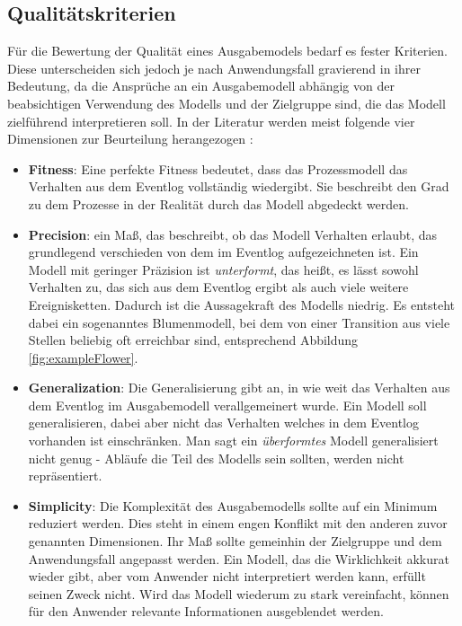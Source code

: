 \subsection{Qualitätskriterien}\label{sec:quality}
Für die Bewertung der Qualität eines Ausgabemodels  bedarf es fester Kriterien. Diese unterscheiden sich jedoch je nach Anwendungsfall gravierend in ihrer Bedeutung, da die Ansprüche an ein Ausgabemodell abhängig von der beabsichtigen Verwendung des Modells und der Zielgruppe sind, die das Modell zielführend interpretieren soll. In der Literatur werden meist folgende vier Dimensionen zur Beurteilung herangezogen \cite{PMinAction}:

\begin{itemize}
\item \textbf{Fitness}: Eine perfekte Fitness bedeutet, dass das Prozessmodell das Verhalten aus dem Eventlog vollständig wiedergibt. Sie beschreibt den Grad zu dem Prozesse in der Realität durch das Modell abgedeckt werden.
 
\item \textbf{Precision}: ein Maß, das beschreibt, ob das Modell Verhalten erlaubt, das grundlegend verschieden von dem im Eventlog aufgezeichneten ist. Ein Modell mit geringer Präzision ist \textit{unterformt}, das heißt, es lässt sowohl Verhalten zu, das sich aus dem Eventlog ergibt als auch viele weitere Ereignisketten. Dadurch ist die Aussagekraft des Modells niedrig. Es entsteht dabei ein sogenanntes Blumenmodell, bei dem von einer Transition aus viele Stellen beliebig oft erreichbar sind, entsprechend Abbildung \ref{fig:exampleFlower}.

\item \textbf{Generalization}: Die Generalisierung gibt an, in wie weit das Verhalten aus dem Eventlog im Ausgabemodell verallgemeinert wurde. Ein Modell soll generalisieren, dabei aber nicht das Verhalten welches in dem Eventlog vorhanden ist einschränken. Man sagt ein \textit{überformtes} Modell generalisiert nicht genug - Abläufe die Teil des Modells sein sollten, werden nicht repräsentiert.

\item \textbf{Simplicity}: Die Komplexität des Ausgabemodells sollte auf ein Minimum reduziert werden. Dies steht in einem engen Konflikt mit den anderen zuvor genannten Dimensionen. Ihr Maß sollte gemeinhin der Zielgruppe und dem Anwendungsfall angepasst werden. Ein Modell, das die Wirklichkeit akkurat wieder gibt, aber vom Anwender nicht interpretiert werden kann, erfüllt seinen Zweck nicht. Wird das Modell wiederum zu stark vereinfacht, können für den Anwender relevante Informationen ausgeblendet werden.
\end{itemize}

